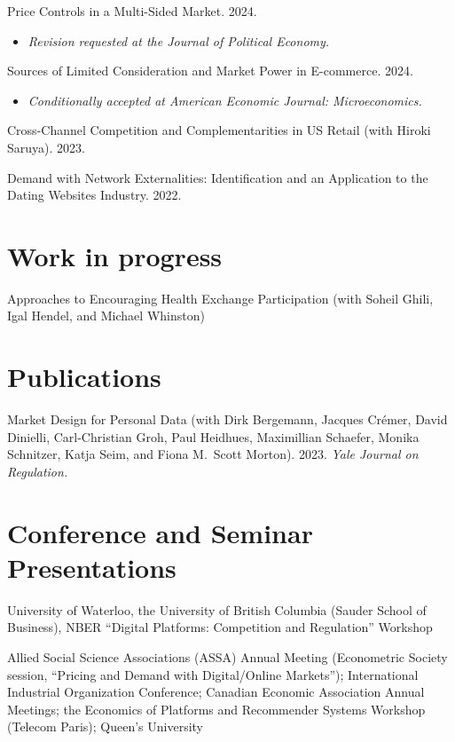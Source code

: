 \documentclass[11pt]{article} %
\begin{document}
Price Controls in a Multi-Sided Market. 2024. 
\begin{itemize}
	\item \textit{Revision requested at the Journal of Political Economy.}
\end{itemize}

\medskip

Sources of Limited Consideration and Market Power in E-commerce. 2024.
\begin{itemize}
	\item \textit{Conditionally accepted at American Economic Journal: Microeconomics.}
\end{itemize}

\medskip

Cross-Channel Competition and Complementarities in US Retail
(with Hiroki Saruya). 2023.

\medskip

 
Demand with Network Externalities: 
Identification and an Application to the Dating Websites Industry. 2022.

\section*{Work in progress}

Approaches to Encouraging Health Exchange Participation 
(with Soheil Ghili, Igal Hendel, and Michael Whinston)


\section*{Publications}

Market Design for Personal Data
(with Dirk Bergemann, Jacques Cr\'{e}mer, David Dinielli, 
Carl-Christian Groh, Paul Heidhues, Maximillian Schaefer, 
Monika Schnitzer, Katja Seim, and Fiona M.\ Scott Morton).
2023. \textit{Yale Journal on Regulation.}




\section*{Conference and Seminar Presentations}

 University of Waterloo,
the University of British Columbia (Sauder School of Business),
NBER ``Digital Platforms: Competition and Regulation'' Workshop

 Allied Social Science Associations (ASSA) Annual Meeting
	(Econometric Society session, ``Pricing and Demand with Digital/Online Markets'');
	International Industrial Organization Conference;
	 Canadian Economic Association Annual Meetings;
		the Economics of Platforms and Recommender Systems Workshop (Telecom Paris);
		Queen's University
	
\end{document}
